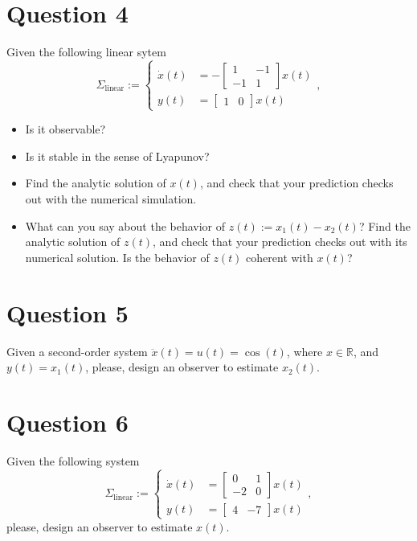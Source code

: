 \documentclass[11pt,a4paper,titlepage]{article}
\begin{document}
\section{Question 4}
Given the following linear sytem
\begin{equation}
	\Sigma_{\text{linear}} := \begin{cases}
		\dot x(t) &= -\begin{bmatrix}1 & -1 \\ -1 & 1\end{bmatrix}x(t) \\
			y(t) &= \begin{bmatrix}1 & 0\end{bmatrix}x(t)
	\end{cases},
\label{eq: sigmalin}
\end{equation}

\begin{itemize}
\item Is it observable?
\item Is it stable in the sense of Lyapunov?
\item Find the analytic solution of $x(t)$, and check that your prediction checks out with the numerical simulation.
\item What can you say about the behavior of $z(t) := x_1(t) - x_2(t)$? Find the analytic solution of $z(t)$, and check that your prediction checks out with its numerical solution. Is the behavior of $z(t)$ coherent with $x(t)$?
\end{itemize}

\section{Question 5}
Given a second-order system $\ddot x(t) = u(t) = \cos(t)$, where $x\in\mathbb{R}$, and $y(t) = x_1(t)$, please, design an observer to estimate $x_2(t)$.

\section{Question 6}
Given the following system
\begin{equation}
	\Sigma_{\text{linear}} := \begin{cases}
		\dot x(t) &= \begin{bmatrix}0 & 1 \\ -2 & 0\end{bmatrix}x(t) \\
			y(t) &= \begin{bmatrix}4 & -7\end{bmatrix}x(t)
	\end{cases},
\label{eq: sigmalin}
\end{equation}
please, design an observer to estimate $x(t)$.
\end{document}
